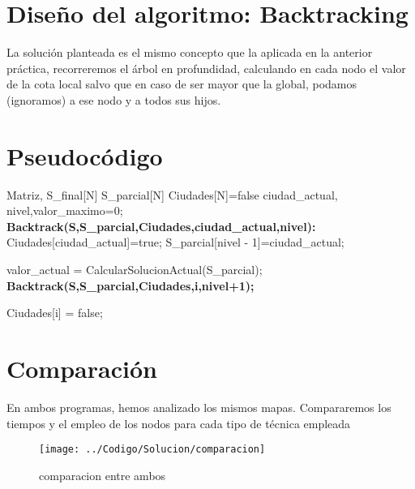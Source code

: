 	
	\section{Diseño del algoritmo: Backtracking} 


		
		La solución planteada es el mismo concepto que la aplicada en la anterior práctica, recorreremos el árbol en profundidad, calculando en cada nodo el valor de la cota local salvo que en caso de ser mayor que la global, podamos (ignoramos) a ese nodo y a todos sus hijos.
		
		

	\section{Pseudocódigo}


		\footnotesize{	
			\begin{algorithmic}				
				\Require Matriz, S\_final[N] S\_parcial[N] Ciudades[N]={false} ciudad\_actual, nivel,valor\_maximo=0;
				\State \textbf{Backtrack(S,S\_parcial,Ciudades,ciudad\_actual,nivel):}
				\State Ciudades[ciudad\_actual]=true;
				\State	   S\_parcial[nivel - 1]=ciudad\_actual;
				
				\State 	valor\_actual = CalcularSolucionActual(S\_parcial);
				\State 	\textbf{Backtrack(S,S\_parcial,Ciudades,i,nivel+1);}
				\EndIf
				\EndIf
				\EndIf
				
				\State Ciudades[i] = false;
				\EndIf
				\EndFor
			\end{algorithmic}			
		}

	
	
	\section{Comparación}


		En ambos programas, hemos analizado los mismos mapas. Compararemos los tiempos y el empleo de los nodos para cada tipo de técnica empleada

	
	


		\begin{figure}[H]
			\centering
			\texttt{[image: ../Codigo/Solucion/comparacion]}
			\caption{comparacion entre ambos }
			\label{fig:comparacion}
		\end{figure}
		
